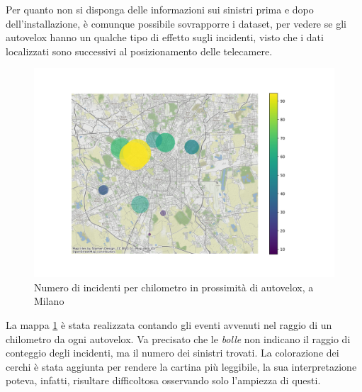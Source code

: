\documentclass[a4paper]{report}
\newcommand{\quotestyle}[1]{\textit{#1}}
\begin{document}
Per quanto non si disponga delle informazioni sui sinistri prima e dopo dell'installazione, 
è comunque possibile sovrapporre i dataset, per vedere se gli autovelox 
hanno un qualche tipo di effetto sugli incidenti, visto che i dati 
localizzati sono successivi al posizionamento delle telecamere. 

\begin{figure}
    \includegraphics[width=\linewidth]{../src/autovelox/autovelox_incidenti.png}
    \caption{Numero di incidenti per chilometro in prossimità di autovelox, a Milano}
    \label{fig:autovelox-incidenti}
\end{figure}

La mappa \ref{fig:autovelox-incidenti} è stata realizzata contando 
gli eventi avvenuti nel raggio di un chilometro da ogni autovelox. 
Va precisato che le \quotestyle{bolle} non indicano il raggio di conteggio degli incidenti, ma 
il numero dei sinistri trovati. 
La colorazione dei cerchi è stata aggiunta per 
rendere la cartina più leggibile, la sua interpretazione poteva, infatti, risultare 
difficoltosa osservando solo l'ampiezza di questi. 
\end{document}

